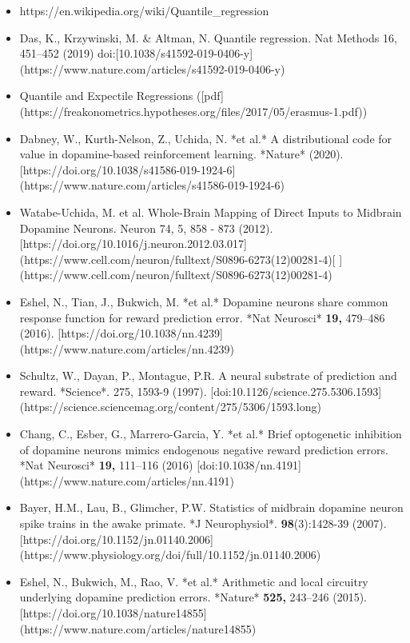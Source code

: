 \begin{itemize}
\item https://en.wikipedia.org/wiki/Quantile_regression
\item Das, K., Krzywinski, M. & Altman, N. Quantile regression. Nat Methods 16, 451–452 (2019) doi:[10.1038/s41592-019-0406-y](https://www.nature.com/articles/s41592-019-0406-y)
\item Quantile and Expectile Regressions ([pdf](https://freakonometrics.hypotheses.org/files/2017/05/erasmus-1.pdf))
\item Dabney, W., Kurth-Nelson, Z., Uchida, N. *et al.* A distributional code for value in dopamine-based reinforcement learning. *Nature* (2020). [https://doi.org/10.1038/s41586-019-1924-6](https://www.nature.com/articles/s41586-019-1924-6)
\item Watabe-Uchida, M. et al. Whole-Brain Mapping of Direct Inputs to Midbrain Dopamine Neurons. Neuron 74, 5, 858 - 873 (2012). [https://doi.org/10.1016/j.neuron.2012.03.017](https://www.cell.com/neuron/fulltext/S0896-6273(12)00281-4)[ ](https://www.cell.com/neuron/fulltext/S0896-6273(12)00281-4)
\item Eshel, N., Tian, J., Bukwich, M. *et al.* Dopamine neurons share common response function for reward prediction error. *Nat Neurosci* \textbf{19,} 479–486 (2016). [https://doi.org/10.1038/nn.4239](https://www.nature.com/articles/nn.4239)
\item Schultz, W., Dayan, P., Montague, P.R. A neural substrate of prediction and reward. *Science*. 275, 1593-9 (1997). [doi:10.1126/science.275.5306.1593](https://science.sciencemag.org/content/275/5306/1593.long)
\item Chang, C., Esber, G., Marrero-Garcia, Y. *et al.* Brief optogenetic inhibition of dopamine neurons mimics endogenous negative reward prediction errors. *Nat Neurosci* \textbf{19,} 111–116 (2016) [doi:10.1038/nn.4191](https://www.nature.com/articles/nn.4191)  
\item Bayer, H.M., Lau, B., Glimcher, P.W. Statistics of midbrain dopamine neuron spike trains in the awake primate. *J Neurophysiol*. \textbf{98}(3):1428-39 (2007). [https://doi.org/10.1152/jn.01140.2006](https://www.physiology.org/doi/full/10.1152/jn.01140.2006)
\item Eshel, N., Bukwich, M., Rao, V. *et al.* Arithmetic and local circuitry underlying dopamine prediction errors. *Nature* \textbf{525,} 243–246 (2015). [https://doi.org/10.1038/nature14855](https://www.nature.com/articles/nature14855)
\end{itemize}
